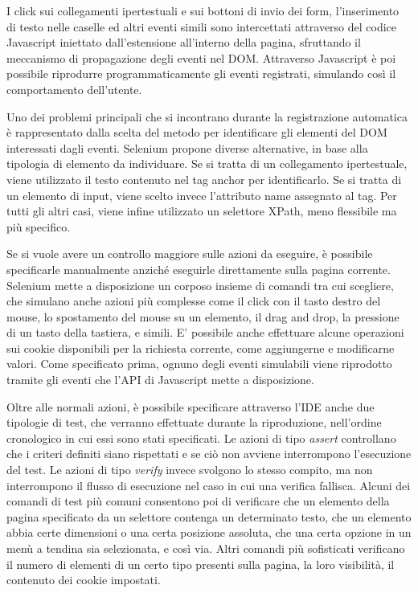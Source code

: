 I click sui collegamenti ipertestuali e sui bottoni di invio dei form, l'inserimento di testo nelle caselle ed altri eventi simili sono intercettati attraverso del codice Javascript iniettato dall'estensione all'interno della pagina, sfruttando il meccanismo di propagazione degli eventi nel DOM. Attraverso Javascript è poi possibile riprodurre programmaticamente gli eventi registrati, simulando così il comportamento dell'utente.

Uno dei problemi principali che si incontrano durante la registrazione automatica è rappresentato dalla scelta del metodo per identificare gli elementi del DOM interessati dagli eventi. Selenium propone diverse alternative, in base alla tipologia di elemento da individuare. Se si tratta di un collegamento ipertestuale, viene utilizzato il testo contenuto nel tag anchor per identificarlo. Se si tratta di un elemento di input, viene scelto invece l'attributo name assegnato al tag. Per tutti gli altri casi, viene infine utilizzato un selettore XPath, meno flessibile ma più specifico.

Se si vuole avere un controllo maggiore sulle azioni da eseguire, è possibile specificarle manualmente anziché eseguirle direttamente sulla pagina corrente. Selenium mette a disposizione un corposo insieme di comandi tra cui scegliere, che simulano anche azioni più complesse come il click con il tasto destro del mouse, lo spostamento del mouse su un elemento, il drag and drop, la pressione di un tasto della tastiera, e simili. E' possibile anche effettuare alcune operazioni sui cookie disponibili per la richiesta corrente, come aggiungerne e modificarne valori. Come specificato prima, ognuno degli eventi simulabili viene riprodotto tramite gli eventi che l'API di Javascript mette a disposizione. 

Oltre alle normali azioni, è possibile specificare attraverso l'IDE anche due tipologie di test, che verranno effettuate durante la riproduzione, nell'ordine cronologico in cui essi sono stati specificati. Le azioni di tipo \emph{assert} controllano che i criteri definiti siano rispettati e se ciò non avviene interrompono l'esecuzione del test. Le azioni di tipo \emph{verify} invece svolgono lo stesso compito, ma non interrompono il flusso di esecuzione nel caso in cui una verifica fallisca.
Alcuni dei comandi di test più comuni consentono poi di verificare che un elemento della pagina specificato da un selettore contenga un determinato testo, che un elemento abbia certe dimensioni o una certa posizione assoluta, che una certa opzione in un menù a tendina sia selezionata, e così via. Altri comandi più sofisticati verificano il numero di elementi di un certo tipo presenti sulla pagina, la loro visibilità, il contenuto dei cookie impostati.

